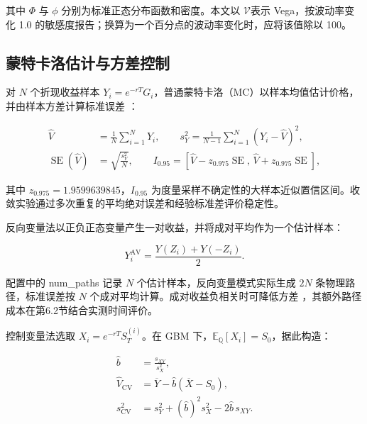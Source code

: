 \documentclass[UTF8,a4paper,zihao=5,fontset=none]{ctexart}
\begin{document}
其中 $\Phi$ 与 $\phi$ 分别为标准正态分布函数和密度。本文以 $\mathcal V$表示 Vega，按波动率变化 1.0 的敏感度报告；换算为一个百分点的波动率变化时，应将该值除以 100。


\subsection{蒙特卡洛估计与方差控制}

对 $N$ 个折现收益样本 $Y_i=e^{-rT}G_i$，普通蒙特卡洛（MC）以样本均值估计价格，并由样本方差计算标准误差 \cite{r3}：


\nopagebreak[4]
\begin{equation}
\label{eq:4}
\begin{aligned}
\widehat V &= \frac1N\sum_{i=1}^{N}Y_i,\qquad
s_Y^2=\frac1{N-1}\sum_{i=1}^{N}(Y_i-\widehat V)^2,\\
\operatorname{SE}(\widehat V)&=\sqrt{\frac{s_Y^2}{N}},\qquad
I_{0.95}=\left[\widehat V-z_{0.975}\operatorname{SE},\,
\widehat V+z_{0.975}\operatorname{SE}\right],
\end{aligned}
\end{equation}

其中 $z_{0.975}=1.9599639845$，$I_{0.95}$ 为度量采样不确定性的大样本近似置信区间。收敛实验通过多次重复的平均绝对误差和经验标准差评价稳定性。


反向变量法以正负正态变量产生一对收益，并将成对平均作为一个估计样本：


\nopagebreak[4]
\begin{equation}
\label{eq:5}
Y_i^{\mathrm{AV}}=\frac{Y(Z_i)+Y(-Z_i)}2.
\end{equation}

配置中的 {\small\ttfamily num\_\allowbreak{}paths} 记录 $N$ 个估计样本，反向变量模式实际生成 $2N$ 条物理路径，标准误差按 $N$ 个成对平均计算。成对收益负相关时可降低方差 \cite{r12}，其额外路径成本在第6.2节结合实测时间评价。


控制变量法选取 $X_i=e^{-rT}S_T^{(i)}$。在 GBM 下，$\mathbb E_{\mathbb Q}[X_i]=S_0$，据此构造：


\nopagebreak[4]
\begin{equation}
\label{eq:6}
\begin{aligned}
\widehat b&=\frac{s_{XY}}{s_X^2},\\
\widehat V_{\mathrm{CV}}&=\overline Y-\widehat b(\overline X-S_0),\\
s_{\mathrm{CV}}^2&=s_Y^2+(\widehat b)^2s_X^2-2\widehat b\,s_{XY}.
\end{aligned}
\end{equation}
\end{document}
